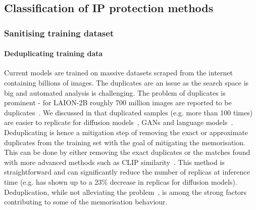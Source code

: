 \documentclass[conference]{IEEEtran}
\begin{document}
\subsection{Classification of IP protection methods}\label{sec:mitigation-categories}
\subsubsection{Sanitising training dataset}\label{sec:mitigation-sanitising}
\paragraph{Deduplicating training data} 
Current models are trained on massive datasets scraped from the internet containing billions of images. The duplicates are an issue as the search space is big and automated analysis is challenging. The problem of duplicates is prominent - for LAION-2B roughly 700 million images are reported to be duplicates~\cite{webster_-duplication_2023}.
We discussed in  that duplicated samples (e.g. more than 100 times) are easier to replicate for diffusion models~\cite{carlini_extracting_2023}, GANs and language models~\cite{carlini_extracting_2021,kandpal_large_2023}.
Deduplicating is hence a mitigation step of removing the exact or approximate duplicates from the training set with the goal of mitigating the memorisation. 
This can be done by either removing the exact duplicates or the matches found with more advanced methods such as CLIP similarity~\cite{radford_learning_2021}. 
This method is straightforward and can significantly reduce the number of replicas at inference time (e.g. \cite{carlini_extracting_2023} has shown up to a 23\% decrease in replicas for diffusion models). 
Deduplication, while not alleviating the problem~\cite{somepalli_understanding_2023}, is among the strong factors contributing to some of the memorisation behaviour.
\end{document}

